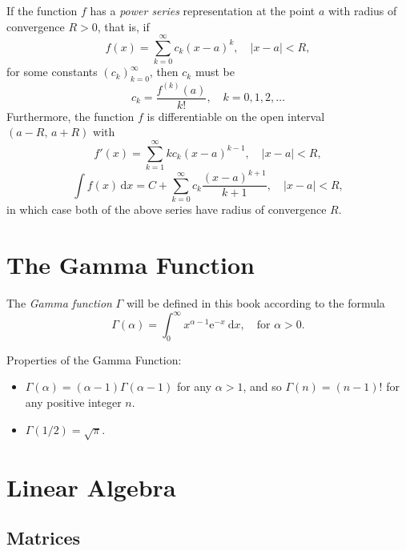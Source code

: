 \documentclass[captions=tableheading]{scrbook}
\begin{document}
If the function \(f\) has a \emph{power series} representation at the point \(a\) with radius of convergence \(R>0\), that is, if
\begin{equation}
f(x)=\sum_{k=0}^{\infty}c_{k}(x-a)^{k},\quad|x-a|<R,
\end{equation}
for some constants \(\left(c_{k}\right)_{k=0}^{\infty}\), then \(c_{k}\) must be
\begin{equation}
c_{k}=\frac{f^{(k)}(a)}{k!},\quad k=0,1,2,\ldots
\end{equation}
Furthermore, the function \(f\) is differentiable on the open interval \((a-R,\, a+R)\) with
\begin{equation}
f'(x)=\sum_{k=1}^{\infty}kc_{k}(x-a)^{k-1},\quad|x-a|<R,
\end{equation}
\begin{equation}
\int f(x)\,\mathrm{d} x=C+\sum_{k=0}^{\infty}c_{k}\frac{(x-a)^{k+1}}{k+1},\quad|x-a|<R,
\end{equation}
in which case both of the above series have radius of convergence \(R\).
\section{The Gamma Function \label{sec:The-Gamma-Function}}
\label{sec-21-4}


The \emph{Gamma function} \(\Gamma\) will be defined in this book according to the formula
\begin{equation}
\Gamma(\alpha)=\int_{0}^{\infty}x^{\alpha-1}\mathrm{e}^{-x}\:\mathrm{d} x,\quad\mbox{for }\alpha > 0.
\end{equation}

\begin{fact}
Properties of the Gamma Function:
\begin{itemize}
\item \(\Gamma(\alpha)=(\alpha - 1)\Gamma(\alpha - 1)\) for any \(\alpha > 1\), and so \(\Gamma(n)=(n-1)!\) for any positive integer \(n\).
\item \(\Gamma(1/2)=\sqrt{\pi}\).
\end{itemize}
\end{fact}
\section{Linear Algebra \label{sec:Linear-Algebra}}
\label{sec-21-5}
\subsection{Matrices}
\label{sec-21-5-1}
\end{document}
